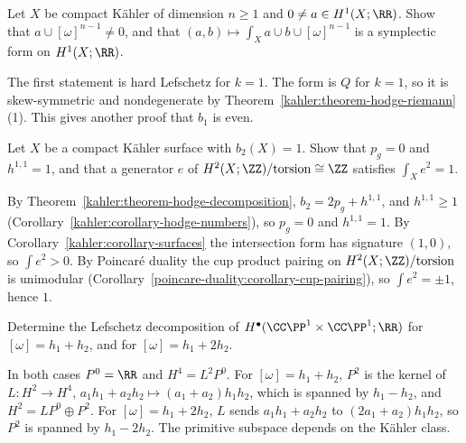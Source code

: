 \begin{exercise}\label{kahler:exercise-h1-injective}
Let $X$ be compact K\"ahler of dimension $n \geq 1$ and $0 \neq a \in H^1(X; \RR)$. Show that $a \cup [\omega]^{n-1} \neq 0$, and that
$(a, b) \mapsto \int_Xa \cup b \cup [\omega]^{n-1}$ is a symplectic form on $H^1(X; \RR)$.
\end{exercise}

\begin{solution}
The first statement is hard Lefschetz for $k = 1$. The form is $Q$ for $k = 1$, so it is skew-symmetric and nondegenerate by
Theorem~\ref{kahler:theorem-hodge-riemann}(1). This gives another proof that $b_1$ is even.
\end{solution}

\begin{exercise}\label{kahler:exercise-b2-kahler-surface}
Let $X$ be a compact K\"ahler surface with $b_2(X) = 1$. Show that $p_g = 0$ and $h^{1,1} = 1$, and that a generator $e$ of
$H^2(X; \ZZ)/\mathrm{torsion} \cong \ZZ$ satisfies $\int_Xe^2 = 1$.
\end{exercise}

\begin{solution}
By Theorem~\ref{kahler:theorem-hodge-decomposition}, $b_2 = 2p_g + h^{1,1}$, and $h^{1,1} \geq 1$
(Corollary~\ref{kahler:corollary-hodge-numbers}), so $p_g = 0$ and $h^{1,1} = 1$. By
Corollary~\ref{kahler:corollary-surfaces} the intersection form has signature $(1, 0)$, so $\int e^2 > 0$. By Poincar\'e duality
the cup product pairing on $H^2(X; \ZZ)/\mathrm{torsion}$ is unimodular (Corollary~\ref{poincare-duality:corollary-cup-pairing}), so
$\int e^2 = \pm 1$, hence $1$.
\end{solution}

\begin{exercise}\label{kahler:exercise-primitive-cp1-squared}
Determine the Lefschetz decomposition of $H^\bullet(\CC\PP^1 \times \CC\PP^1; \RR)$ for $[\omega] = h_1 + h_2$, and for
$[\omega] = h_1 + 2h_2$.
\end{exercise}

\begin{solution}
In both cases $P^0 = \RR$ and $H^4 = L^2P^0$. For $[\omega] = h_1 + h_2$, $P^2$ is the kernel of $L \colon H^2 \to H^4$,
$a_1h_1 + a_2h_2 \mapsto (a_1 + a_2)h_1h_2$, which is spanned by $h_1 - h_2$, and $H^2 = LP^0 \oplus P^2$. For $[\omega] = h_1 + 2h_2$, $L$
sends $a_1h_1 + a_2h_2$ to $(2a_1 + a_2)h_1h_2$, so $P^2$ is spanned by $h_1 - 2h_2$. The primitive subspace depends on the K\"ahler class.
\end{solution}


